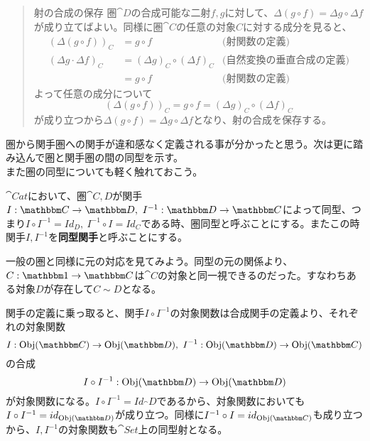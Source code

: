 \begin{define}[対角関手]
\begin{quote}
\begin{mydescription}
				\item[射の合成の保存] 圏$\cat{D}$の合成可能な二射$f,g$に対して、$\varDelta(g\circ f)=\varDelta g\circ \varDelta f$が成り立てばよい。同様に圏$\cat{C}$の任意の対象$C$に対する成分を見ると、
        \begin{align*}
          (\varDelta(g\circ f))_C&=g\circ f&\text{(射関数の定義)}\\
          (\varDelta g\cdot\varDelta f)_C &= (\varDelta g)_C\circ (\varDelta f)_C&\text{(自然変換の垂直合成の定義)}\\
          &=g\circ f&\text{(射関数の定義)}
        \end{align*}
        よって任意の成分について\[(\varDelta(g\circ f))_C=g\circ f=(\varDelta g)_C\circ (\varDelta f)_C\]が成り立つから$\varDelta(g\circ f)=\varDelta g\circ \varDelta f$となり、射の合成を保存する。
			\end{mydescription}
		\end{quote}
  \end{define}

  圏から関手圏への関手が違和感なく定義される事が分かったと思う。次は更に踏み込んで圏と関手圏の間の同型を示す。\\
  また圏の同型についても軽く触れておこう。
  \begin{define}[圏同型]
    $\cat{Cat}$において、圏$\cat{C,D}$が関手$\functor{I}{C}{D},\ \functor{I^{-1}}{D}{C}$によって同型、つまり$I\circ I^{-1}=Id_D,\ I^{-1}\circ I=Id_C$である時、圏同型と呼ぶことにする。またこの時関手$I,I^{-1}$を\textbf{同型関手}と呼ぶことにする。
  \end{define}
  一般の圏と同様に元の対応を見てみよう。同型の元の関係より、$\functor{C}{1}{C}$は$\cat{C}$の対象と同一視できるのだった。すなわちある対象$D$が存在して$C\sim D$となる。\\

  \begin{center}
  \end{center}
  関手の定義に乗っ取ると、関手$I\circ I^{-1}$の対象関数は合成関手の定義より、それぞれの対象関数\[\mor{I}{\obj{C}}{\obj{D}},\ \mor{I^{-1}}{\obj{D}}{\obj{C}}\]の合成\[\mor{I\circ I^{-1}}{\obj{D}}{\obj{D}}\]が対象関数になる。$I\circ I^{-1}=Id_\cat{D}$であるから、対象関数においても$I\circ I^{-1}=id_{\obj{D}}$が成り立つ。同様に$I^{-1}\circ I=id_{\obj{C}}$も成り立つから、$I,I^{-1}$の対象関数も$\cat{Set}$上の同型射となる。

